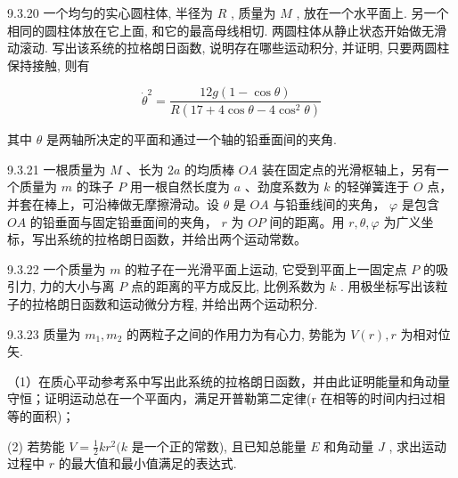 \begin{problem}{9.3.20}
一个均匀的实心圆柱体, 半径为 $R$ , 质量为 $M$ , 放在一个水平面上. 另一个相同的圆柱体放在它上面, 和它的最高母线相切. 两圆柱体从静止状态开始做无滑动滚动. 写出该系统的拉格朗日函数, 说明存在哪些运动积分, 并证明, 只要两圆柱保持接触, 则有

\[
\dot {\theta} ^ {2} = \frac {1 2 g (1 - \cos \theta)}{R (1 7 + 4 \cos \theta - 4 \cos^ {2} \theta)}
\]

其中 $\theta$ 是两轴所决定的平面和通过一个轴的铅垂面间的夹角.
\begin{center}

\end{center}
\end{problem}
\clearpage


\begin{problem}{9.3.21}
一根质量为 $M$ 、长为 $2a$ 的均质棒 $OA$ 装在固定点的光滑枢轴上，另有一个质量为 $m$ 的珠子 $P$ 用一根自然长度为 $a$ 、劲度系数为 $k$ 的轻弹簧连于 $O$ 点，并套在棒上，可沿棒做无摩擦滑动。设 $\theta$ 是 $OA$ 与铅垂线间的夹角， $\varphi$ 是包含 $OA$ 的铅垂面与固定铅垂面间的夹角， $r$ 为 $OP$ 间的距离。用 $r, \theta, \varphi$ 为广义坐标，写出系统的拉格朗日函数，并给出两个运动常数。
\begin{center}

\end{center}
\end{problem}
\clearpage


\begin{problem}{9.3.22}
一个质量为 $m$ 的粒子在一光滑平面上运动, 它受到平面上一固定点 $P$ 的吸引力, 力的大小与离 $P$ 点的距离的平方成反比, 比例系数为 $k$ . 用极坐标写出该粒子的拉格朗日函数和运动微分方程, 并给出两个运动积分.
\end{problem}
\clearpage


\begin{problem}{9.3.23}
质量为 $m_{1}, m_{2}$ 的两粒子之间的作用力为有心力, 势能为 $V(r), r$ 为相对位矢.

（1）在质心平动参考系中写出此系统的拉格朗日函数，并由此证明能量和角动量守恒；证明运动总在一个平面内，满足开普勒第二定律(r 在相等的时间内扫过相等的面积)；

(2) 若势能 $V = \frac{1}{2} kr^2 (k$ 是一个正的常数), 且已知总能量 $E$ 和角动量 $J$ , 求出运动过程中 $r$ 的最大值和最小值满足的表达式.
\begin{center}

\end{center}
\end{problem}
\clearpage


